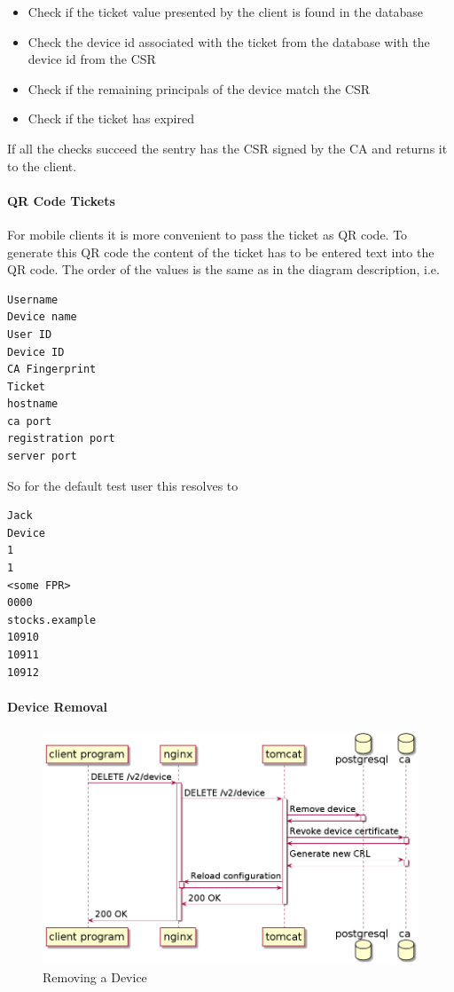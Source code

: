 \documentclass[a4paper]{memoir}
\begin{document}
\begin{itemize}
    \item Check if the ticket value presented by the client is found in the
            database
    \item Check the device id associated with the ticket from the database with
            the  device id from the CSR
    \item Check if the remaining principals of the device match the CSR
    \item Check if the ticket has expired
\end{itemize}

If all the checks succeed the sentry has the CSR signed by the CA and returns it
to the client.

\paragraph{QR Code Tickets}

For mobile clients it is more convenient to pass the ticket as QR code. To
generate this QR code the content of the ticket has to be entered text into the
QR code. The order of the values is the same as in the diagram description, i.e.

\begin{lstlisting}
Username
Device name
User ID
Device ID
CA Fingerprint
Ticket
hostname
ca port
registration port
server port
\end{lstlisting}

So for the default test user this resolves to

\begin{lstlisting}
Jack
Device
1
1
<some FPR>
0000
stocks.example
10910
10911
10912
\end{lstlisting}

\paragraph{Device Removal\\}

\begin{figure}[!ht]
\includegraphics[width=\linewidth]{diagrams/remove-device.png}
\caption{Removing a Device}
\end{figure}
\end{document}
